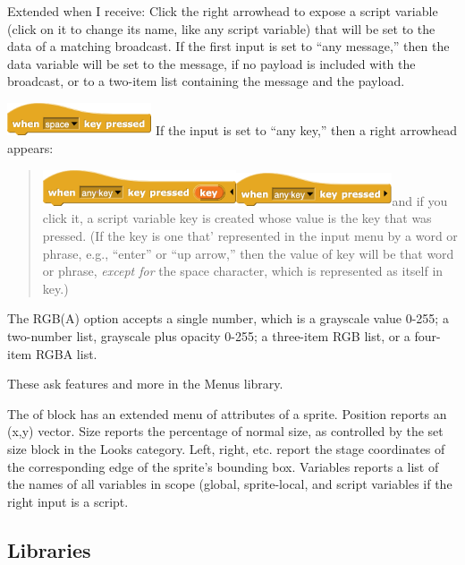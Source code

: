 Extended when I receive: Click the right arrowhead to expose a script
variable (click on it to change its name, like any script variable) that
will be set to the data of a matching broadcast. If the first input is
set to ``any message,'' then the data variable will be set to the
message, if no payload is included with the broadcast, or to a two-item
list containing the message and the payload.

\includegraphics[width=1.68in,height=0.38in]{media/image355.png} If the
input is set to ``any key,'' then a right arrowhead appears:

\begin{quote}
\includegraphics[width=2.25in,height=0.41944in]{media/image356.png}\includegraphics[width=1.81944in,height=0.37986in]{media/image357.png}and
if you click it, a script variable key is created whose value is the key
that was pressed. (If the key is one that' represented in the input menu
by a word or phrase, e.g., ``enter'' or ``up arrow,'' then the value of
key will be that word or phrase, \emph{except for} the space character,
which is represented as itself in key.)\\
\label{ask_lists}{}
\end{quote}

The RGB(A) option accepts a single number, which is a grayscale value
0-255; a two-number list, grayscale plus opacity 0-255; a three-item RGB
list, or a four-item RGBA list.

These ask features and more in the Menus library.

The of block has an extended menu of attributes of a sprite. Position
reports an (x,y) vector. Size reports the percentage of normal size, as
controlled by the set size block in the Looks category. Left, right,
etc. report the stage coordinates of the corresponding edge of the
sprite's bounding box. Variables reports a list of the names of all
variables in scope (global, sprite-local, and script variables if the
right input is a script.

\subsection{\texorpdfstring{\hfill\break
Libraries}{ Libraries}}\label{libraries}

